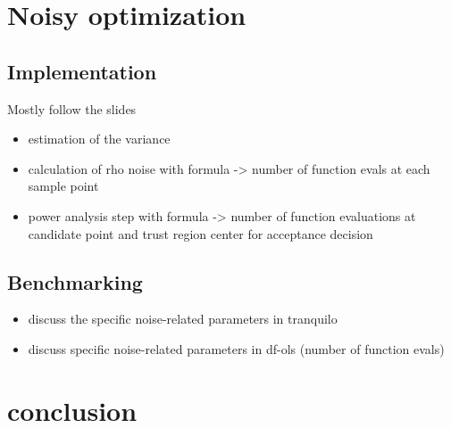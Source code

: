 \section{Noisy optimization}

\subsection{Implementation}
Mostly follow the slides
\begin{itemize}
    \item estimation of the variance
    \item calculation of rho noise with formula -> number of function evals at each sample point
    \item power analysis step with formula -> number of function evaluations at candidate point and trust region center for acceptance decision
\end{itemize}
\subsection{Benchmarking}
\begin{itemize}
    \item discuss the specific noise-related parameters in tranquilo
    \item discuss specific noise-related parameters in df-ols (number of function evals)
\end{itemize}

\section{conclusion}

